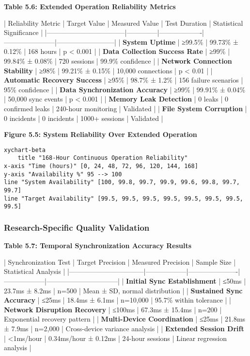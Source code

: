 \documentclass[11pt,a4paper]{report}
\begin{document}
\textbf{Table 5.6: Extended Operation Reliability Metrics}

| Reliability Metric                | Target Value | Measured Value    | Test Duration         | Statistical Significance |
|-----------------------------------|--------------|-------------------|-----------------------|--------------------------|
| \textbf{System Uptime}                 | ≥99.5\%       | 99.73\% ± 0.12\%    | 168 hours             | p < 0.001                |
| \textbf{Data Collection Success Rate}  | ≥99\%         | 99.84\% ± 0.08\%    | 720 sessions          | 99.9\% confidence         |
| \textbf{Network Connection Stability}  | ≥98\%         | 99.21\% ± 0.15\%    | 10,000 connections    | p < 0.01                 |
| \textbf{Automatic Recovery Success}    | ≥95\%         | 98.7\% ± 1.2\%      | 156 failure scenarios | 95\% confidence           |
| \textbf{Data Synchronization Accuracy} | ≥99\%         | 99.91\% ± 0.04\%    | 50,000 sync events    | p < 0.001                |
| \textbf{Memory Leak Detection}         | 0 leaks      | 0 confirmed leaks | 240-hour monitoring   | Validated                |
| \textbf{File System Corruption}        | 0 incidents  | 0 incidents       | 1000+ sessions        | Validated                |

\textbf{Figure 5.5: System Reliability Over Extended Operation}

\begin{verbatim}
xychart-beta
    title "168-Hour Continuous Operation Reliability"
x-axis "Time (hours)" [0, 24, 48, 72, 96, 120, 144, 168]
y-axis "Availability %" 95 --> 100
line "System Availability" [100, 99.8, 99.7, 99.9, 99.6, 99.8, 99.7, 99.7]
line "Target Availability" [99.5, 99.5, 99.5, 99.5, 99.5, 99.5, 99.5, 99.5]
\end{verbatim}

\subsubsection{Research-Specific Quality Validation}

\textbf{Table 5.7: Temporal Synchronization Accuracy Results}

| Synchronization Test            | Target Precision | Measured Precision   | Sample Size      | Statistical Analysis           |
|---------------------------------|------------------|----------------------|------------------|--------------------------------|
| \textbf{Initial Sync Establishment}  | ≤50ms            | 23.7ms ± 8.2ms       | n=500            | Mean ± SD, normal distribution |
| \textbf{Sustained Sync Accuracy}     | ≤25ms            | 18.4ms ± 6.1ms       | n=10,000         | 95.7\% within tolerance         |
| \textbf{Network Disruption Recovery} | ≤100ms           | 67.3ms ± 15.4ms      | n=200            | Exponential recovery pattern   |
| \textbf{Multi-Device Coordination}   | ≤25ms            | 21.8ms ± 7.9ms       | n=2,000          | Cross-device variance analysis |
| \textbf{Extended Session Drift}      | <1ms/hour        | 0.34ms/hour ± 0.12ms | 24-hour sessions | Linear regression analysis     |
\end{document}
